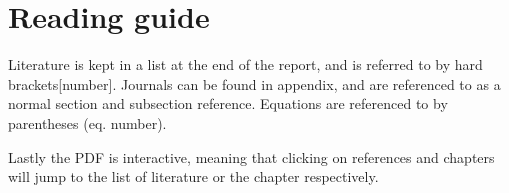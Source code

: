 \documentclass[../../main]{subfiles}
\begin{document}
\section*{Reading guide}
\label{sec:reading_guide}
Literature is kept in a list at the end of the report, and is referred to by hard brackets[number].
Journals can be found in appendix, and are referenced to as a normal section and subsection reference.
Equations are referenced to by parentheses (eq. number).

Lastly the PDF is interactive, meaning that clicking on references and chapters will jump to the list of literature or the chapter respectively.
\end{document}
